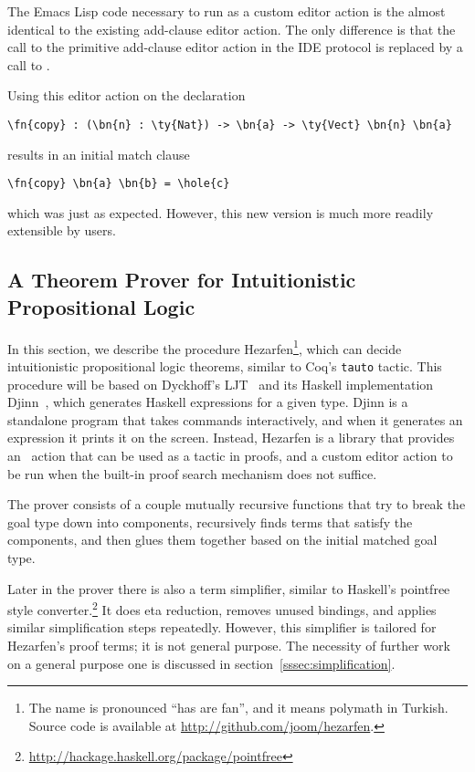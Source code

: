 The Emacs Lisp code necessary to run  as a custom editor
action is the almost identical to the existing add-clause editor
action.  The only difference is that the call to the primitive
add-clause editor action in the IDE protocol is replaced by a call to
.

Using this editor action on the declaration
\begin{Verbatim}
\fn{copy} : (\bn{n} : \ty{Nat}) -> \bn{a} -> \ty{Vect} \bn{n} \bn{a}
\end{Verbatim}
results in an initial match clause
\begin{Verbatim}
\fn{copy} \bn{a} \bn{b} = \hole{c}
\end{Verbatim}
which was just as expected. However, this new version is much more
readily extensible by users.

\subsection{A Theorem Prover for Intuitionistic Propositional Logic}\label{sec:hezarfen}

In this section, we describe the procedure Hezarfen\footnote{The name is
  pronounced ``has are fan'', and it means
    polymath in Turkish. Source code is available at
    \url{http://github.com/joom/hezarfen}.}, which can decide intuitionistic
propositional logic theorems, similar to Coq's \texttt{tauto} tactic.
This procedure will be based on Dyckhoff's LJT~\cite{ljt} and its Haskell
implementation Djinn~\cite{djinn}, which generates Haskell expressions
for a given type.
Djinn is a standalone program that takes commands
interactively, and when it generates an expression it prints it on the screen.
Instead, Hezarfen is a library that provides an \Elab\ action
that can be used as a tactic in proofs, and a custom editor action to be run
when the built-in proof search mechanism does not suffice.

The prover consists of a couple mutually recursive functions that try to break
the goal type down into components, recursively finds terms that satisfy the
components, and then glues them together based on the initial matched goal
type.

Later in the prover there is also a term simplifier, similar to Haskell's
pointfree style
converter.\footnote{\url{http://hackage.haskell.org/package/pointfree}} It does
eta reduction, removes unused  bindings, and applies similar
simplification steps repeatedly.
However, this simplifier is tailored for Hezarfen's proof terms; it is not
general purpose.  The necessity of further work on a general purpose one is
discussed in section~\ref{sssec:simplification}.

